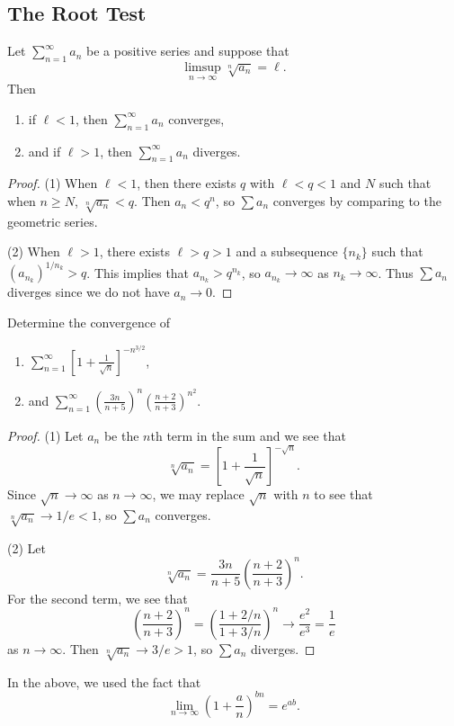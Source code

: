 \subsection{The Root Test}
\begin{theorem}
  Let $\sum_{n = 1}^\infty a_n$ be a positive series and
  suppose that
  \[\limsup_{n \to \infty} \sqrt[n]{a_n} = \ell.\]
  Then
  \begin{enumerate}
    \item if $\ell < 1$, then $\sum_{n = 1}^\infty a_n$ converges,
    \item and if $\ell > 1$, then $\sum_{n = 1}^\infty a_n$ diverges.
  \end{enumerate}
\end{theorem}

\begin{proof}
  (1) When $\ell < 1$, then there exists $q$ with
  $\ell < q < 1$ and $N$ such that when $n \ge N$,
  $\sqrt[n]{a_n} < q$. Then $a_n < q^n$,
  so $\sum a_n$ converges by comparing to the
  geometric series.

  (2) When $\ell > 1$, there exists $\ell > q > 1$ and
  a subsequence $\{n_k\}$ such that
  $(a_{n_k})^{1 / n_k} > q$. This implies that
  $a_{n_k} > q^{n_k}$, so $a_{n_k} \to \infty$ as
  $n_k \to \infty$. Thus $\sum a_n$ diverges since
  we do not have $a_n \to 0$.
\end{proof}

\begin{example}
  Determine the convergence of
  \begin{enumerate}
    \item $\displaystyle \sum_{n =1 }^\infty \left[1 + \frac{1}{\sqrt{n}}\right]^{-n^{3 / 2}}$,
    \item and $\displaystyle \sum_{n = 1}^\infty \left(\frac{3n}{n + 5}\right)^n \left(\frac{n + 2}{n + 3}\right)^{n^2}$.
  \end{enumerate}
\end{example}

\begin{proof}
  (1) Let $a_n$ be the $n$th term in the sum and we
  see that
  \[
    \sqrt[n]{a_n} =
    \left[1 + \frac{1}{\sqrt{n}}\right]^{-\sqrt{n}}.
  \]
  Since $\sqrt{n} \to \infty$ as $n \to \infty$, we
  may replace $\sqrt{n}$ with $n$ to see that
  $\sqrt[n]{a_n} \to 1 / e < 1$, so
  $\sum a_n$ converges.

  (2) Let
  \[
    \sqrt[n]{a_n} = \frac{3n}{n + 5} \left(\frac{n + 2}{n + 3}\right)^n.
  \]
  For the second term, we see that
  \[
    \left(\frac{n + 2}{n + 3}\right)^n
    = \left(\frac{1 + 2 / n}{1 + 3 / n}\right)^n
    \longrightarrow \frac{e^2}{e^3} = \frac{1}{e}
  \]
  as $n \to \infty$.
  Then $\sqrt[n]{a_n} \to 3 / e > 1$, so
  $\sum a_n$ diverges.
\end{proof}

\begin{remark}
  In the above, we used the fact that
  \[
    \lim_{n \to \infty} \left(1 + \frac{a}{n}\right)^{bn}
    = e^{ab}.
  \]
\end{remark}
